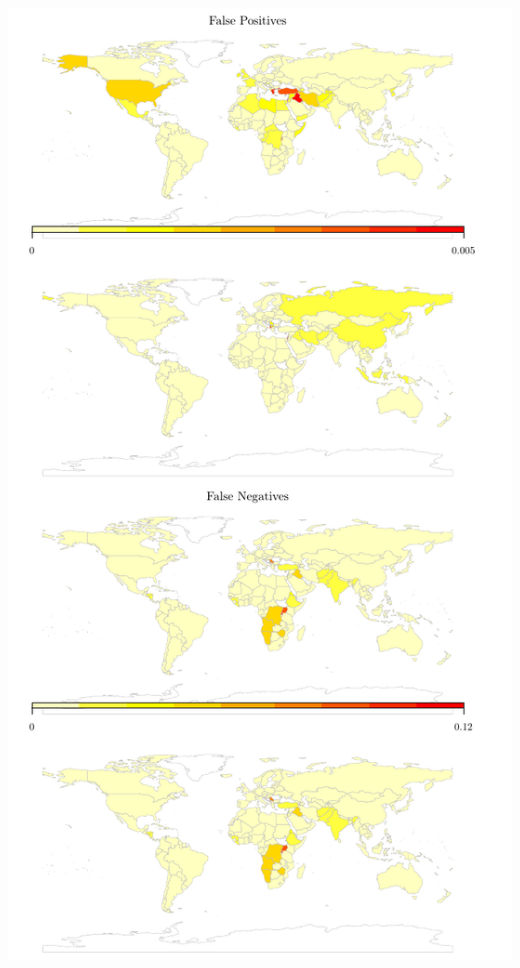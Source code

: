 \documentclass[landscape, paperwidth=42in, paperheight=36in,
fontscale=.35, margin=1in]{baposter}
\begin{document}
\begin{poster}
{    \begin{center}
      \includegraphics{../graphics/diagnostics.pdf}
    \end{center}


}
\end{poster}
\end{document}
